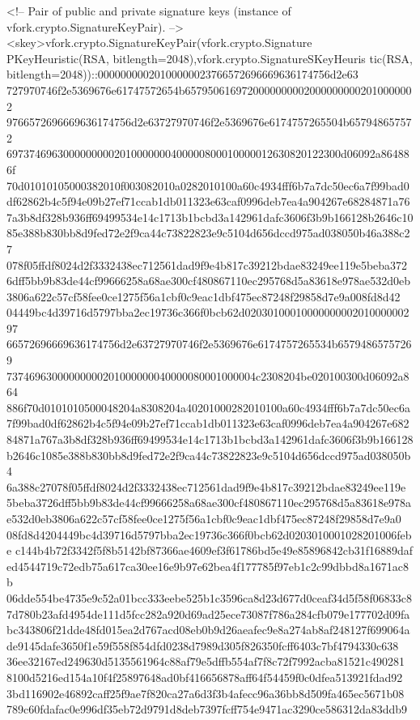    <!-- Pair of public and private signature keys (instance of 
        vfork.crypto.SignatureKeyPair). -->
   <skey>vfork.crypto.SignatureKeyPair(vfork.crypto.Signature
PKeyHeuristic(RSA, bitlength=2048),vfork.crypto.SignatureSKeyHeuris
tic(RSA, bitlength=2048))::00000000020100000023766572696669636174756d2e63
727970746f2e5369676e61747572654b65795061697200000000020000000002010000002
9766572696669636174756d2e63727970746f2e5369676e6174757265504b657948657572
69737469630000000002010000000400000800010000012630820122300d06092a864886f
70d01010105000382010f003082010a0282010100a60c4934fff6b7a7dc50ec6a7f99bad0
df62862b4c5f94e09b27ef71ccab1db011323e63caf0996deb7ea4a904267e68284871a76
7a3b8df328b936ff69499534e14c1713b1bcbd3a142961dafc3606f3b9b166128b2646c10
85e388b830bb8d9fed72e2f9ca44c73822823e9c5104d656dccd975ad038050b46a388c27
078f05ffdf8024d2f3332438ec712561dad9f9e4b817c39212bdae83249ee119e5beba372
6dff5bb9b83de44cf99666258a68ae300cf480867110ec295768d5a83618e978ae532d0eb
3806a622c57cf58fee0ce1275f56a1cbf0c9eac1dbf475ec87248f29858d7e9a008fd8d42
04449bc4d39716d5797bba2ec19736c366f0bcb62d0203010001000000000201000000297
66572696669636174756d2e63727970746f2e5369676e6174757265534b65794865757269
73746963000000000201000000040000080001000004c2308204be020100300d06092a864
886f70d0101010500048204a8308204a40201000282010100a60c4934fff6b7a7dc50ec6a
7f99bad0df62862b4c5f94e09b27ef71ccab1db011323e63caf0996deb7ea4a904267e682
84871a767a3b8df328b936ff69499534e14c1713b1bcbd3a142961dafc3606f3b9b166128
b2646c1085e388b830bb8d9fed72e2f9ca44c73822823e9c5104d656dccd975ad038050b4
6a388c27078f05ffdf8024d2f3332438ec712561dad9f9e4b817c39212bdae83249ee119e
5beba3726dff5bb9b83de44cf99666258a68ae300cf480867110ec295768d5a83618e978a
e532d0eb3806a622c57cf58fee0ce1275f56a1cbf0c9eac1dbf475ec87248f29858d7e9a0
08fd8d4204449bc4d39716d5797bba2ec19736c366f0bcb62d0203010001028201006febe
c144b4b72f3342f5f8b5142bf87366ae4609ef3f61786bd5e49e85896842cb31f16889daf
ed4544719c72edb75a617ca30ee16e9b97e62bea4f177785f97eb1c2c99dbbd8a1671ac8b
06dde554be4735e9c52a01bcc333eebe525b1c3596ca8d23d677d0ceaf34d5f58f06833c8
7d780b23afd4954de111d5fcc282a920d69ad25ece73087f786a284cfb079e177702d09fa
bc343806f21dde48fd015ea2d767acd08eb0b9d26aeafec9e8a274ab8af248127f699064a
de9145dafe3650f1e59f558f854dfd0238d7989d305f826350fcff6403c7bf4794330c638
36ee32167ed249630d5135561964c88af79e5dffb554af7f8c72f7992acba81521c490281
8100d5216ed154a10f4f25897648ad0bf416656878aff64f54459f0c0dfea513921fdad92
3bd116902e46892caff25f9ae7f820ca27a6d3f3b4afecc96a36bb8d509fa465ec5671b08
789c60fdafac0e996df35eb72d9791d8deb7397fcff754e9471ac3290ce586312da83ddb9
